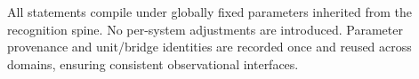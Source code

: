 \documentclass[aps,prd,twocolumn,superscriptaddress,nofootinbib,floatfix,longbibliography]{revtex4-2}
\newcommand{\lean}[1]{\texttt{\detokenize{#1}}}
\begin{document}
%
%
All statements compile under globally fixed parameters inherited from the recognition spine. No per-system adjustments are introduced. Parameter provenance and unit/bridge identities are recorded once and reused across domains, ensuring consistent observational interfaces.
%
\end{document}
